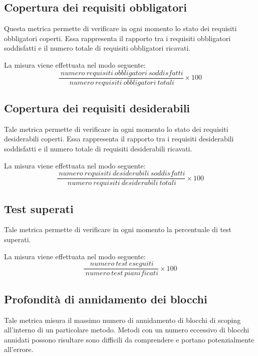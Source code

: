 \subsection{Copertura dei requisiti obbligatori}
Questa metrica permette di verificare in ogni momento lo stato dei requisiti obbligatori coperti. Essa rappresenta il rapporto tra i requisiti obbligatori soddisfatti e il numero totale di requisiti obbligatori ricavati.

La misura viene effettuata nel modo seguente:
\begin{equation}
	\frac{~numero~requisiti~obbligatori~soddisfatti}{~numero~requisiti~obbligatori~totali}\times{100}
\end{equation}



\subsection{Copertura dei requisiti desiderabili}
Tale metrica permette di verificare in ogni momento lo stato dei requisiti desiderabili coperti. Essa rappresenta il rapporto tra i requisiti desiderabili soddisfatti e il numero totale di requisiti desiderabili ricavati.

La misura viene effettuata nel modo seguente:
\begin{equation}
	\frac{~numero~requisiti~desiderabili~soddisfatti}{~numero~requisiti~desiderabili~totali}\times{100}
\end{equation}



\subsection{Test superati}
Tale metrica permette di verificare in ogni momento la percentuale di test superati.

La misura viene effettuata nel modo seguente:
\begin{equation}
	\frac{~numero~test~eseguiti}{~numero~test~pianificati}\times{100}
\end{equation}



\subsection{Profondità di annidamento dei blocchi}
Tale metrica misura il massimo numero di annidamento di blocchi di scoping all'interno di un particolare metodo. Metodi con un numero eccessivo di blocchi annidati possono risultare sono difficili da comprendere e portano potenzialmente all'errore.



